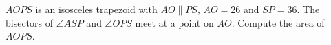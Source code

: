 $AOPS$ is an isosceles trapezoid with $AO\parallel PS$, $AO=26$ and $SP=36$. The bisectors of $\angle ASP$ and $\angle OPS$ meet at a point on $AO$. Compute the area of $AOPS$.
